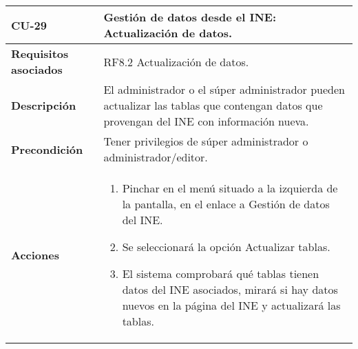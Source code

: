\newpage
\begin{longtable}[t]{@{}ll@{}}
\toprule
\begin{minipage}[t]{0.23\columnwidth}\raggedright\strut
\textbf{CU-29}\strut
\end{minipage} & \begin{minipage}[b]{0.71\columnwidth}\raggedright\strut
\textbf{Gestión de datos desde el INE: Actualización de datos.}\strut
\end{minipage}\tabularnewline
\midrule
\endhead
\begin{minipage}[t]{0.23\columnwidth}\raggedright\strut
\textbf{Requisitos asociados}\strut
\end{minipage} & \begin{minipage}[t]{0.71\columnwidth}\raggedright\strut
RF8.2  Actualización de datos. \strut
\end{minipage}\tabularnewline
\begin{minipage}[t]{0.23\columnwidth}\raggedright\strut
\textbf{Descripción}\strut
\end{minipage} & \begin{minipage}[t]{0.71\columnwidth}\raggedright\strut
 El administrador o el súper administrador pueden actualizar las tablas que contengan datos que provengan del INE con información nueva.
\strut
\end{minipage}\tabularnewline
\begin{minipage}[t]{0.23\columnwidth}\raggedright\strut
\textbf{Precondición}\strut
\end{minipage} & \begin{minipage}[t]{0.71\columnwidth}\raggedright\strut
Tener privilegios de súper administrador o administrador/editor.\strut
\end{minipage}\tabularnewline
\begin{minipage}[t]{0.23\columnwidth}\raggedright\strut
\textbf{Acciones}\strut
\end{minipage} & \begin{minipage}[t]{0.71\columnwidth}\raggedright\strut
\begin{enumerate}
\def\labelenumi{\arabic{enumi}.}
\tightlist
\item
Pinchar en el menú situado a la izquierda de la pantalla, en el
enlace a Gestión de datos del INE.
\item
Se seleccionará la opción Actualizar tablas.
\item
El sistema comprobará qué tablas tienen datos del INE asociados, mirará si hay datos nuevos en la página del INE y actualizará las tablas.

\end{enumerate}
\end{minipage}
\end{longtable}
